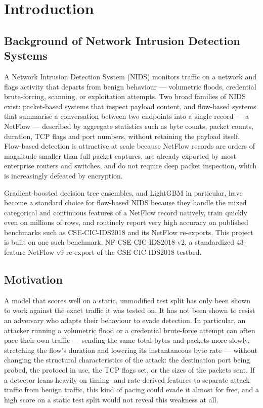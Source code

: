 \documentclass[12pt,a4paper]{report}
\begin{document}
\chapter{Introduction}
\section{Background of Network Intrusion Detection Systems}
A Network Intrusion Detection System (NIDS) monitors traffic on a network and flags activity that departs from benign behaviour --- volumetric floods, credential brute-forcing, scanning, or exploitation attempts. Two broad families of NIDS exist: packet-based systems that inspect payload content, and flow-based systems that summarise a conversation between two endpoints into a single record --- a NetFlow --- described by aggregate statistics such as byte counts, packet counts, duration, TCP flags and port numbers, without retaining the payload itself. Flow-based detection is attractive at scale because NetFlow records are orders of magnitude smaller than full packet captures, are already exported by most enterprise routers and switches, and do not require deep packet inspection, which is increasingly defeated by encryption.

Gradient-boosted decision tree ensembles, and LightGBM in particular, have become a standard choice for flow-based NIDS because they handle the mixed categorical and continuous features of a NetFlow record natively, train quickly even on millions of rows, and routinely report very high accuracy on published benchmarks such as CSE-CIC-IDS2018 and its NetFlow re-exports. This project is built on one such benchmark, NF-CSE-CIC-IDS2018-v2, a standardized 43-feature NetFlow v9 re-export of the CSE-CIC-IDS2018 testbed.

\section{Motivation}
A model that scores well on a static, unmodified test split has only been shown to work against the exact traffic it was tested on. It has not been shown to resist an adversary who adapts their behaviour to evade detection. In particular, an attacker running a volumetric flood or a credential brute-force attempt can often pace their own traffic --- sending the same total bytes and packets more slowly, stretching the flow's duration and lowering its instantaneous byte rate --- without changing the structural characteristics of the attack: the destination port being probed, the protocol in use, the TCP flags set, or the sizes of the packets sent. If a detector leans heavily on timing- and rate-derived features to separate attack traffic from benign traffic, this kind of pacing could evade it almost for free, and a high score on a static test split would not reveal this weakness at all.
\end{document}
